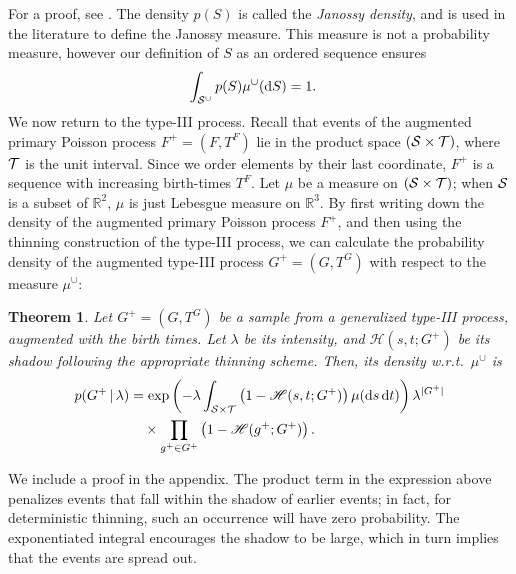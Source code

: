 \documentclass{statsoc}
\newtheorem{thrm}[defn]{Theorem}
\begin{document}
\vspace{-.02in}
For a proof, see \cite{DalVer2008a}. The density $p(S)$ is called the \emph{Janossy density}, and is %
used in the literature to define the Janossy measure. This measure is not a probability measure, however 
our definition of $S$ as an ordered sequence ensures %
\begin{align}
  \int_{\mathcal{S}^{\cup}} p(S) \mu^{\cup}(\mathrm{d} S) &= 1.
\end{align}
We now return to the \matern type-III process. Recall that events of the augmented primary Poisson process ${F^{+} = (F, T^F)}$ lie in the product space
$({\mathcal S} \times {\mathcal T})$, where ${\mathcal T}$ is the unit interval. %
Since we order elements by their last coordinate, $F^+$ is a sequence with increasing birth-times $T^F$.
Let $\mu$ be a measure on $({\mathcal S} \times {\mathcal T})$; when ${\mathcal S}$ is a subset of $\mathbb{R}^2$, $\mu$ is just 
Lebesgue measure on $\mathbb{R}^3$. 
By first writing down the density of the augmented primary Poisson process $F^+$, and then using the thinning construction of the 
\matern type-III process, we can calculate the probability density of the augmented \matern type-III process ${G^{+} = (G, T^G)}$ with respect to the 
measure ${\mu}^{\cup}$:
\begin{thrm}  \label{thrm:mat_dens} Let $G^+ = (G, T^G)$ be a sample from a generalized \matern type-III process, augmented with the birth 
  times. Let $\lambda$ be its intensity, and $\mathscr{H}(s,t;G^+)$ be its shadow following the appropriate thinning scheme. %
Then, its density w.r.t.\  ${\mu}^{\cup}$ is 
\begin{align}
 p(G^+ \,|\, \lambda) &=\exp\left(-\lambda \int_{{\mathcal S} \times {\mathcal T}}\left( 1 - \mathscr{H}(s,t;G^+)\right)\mu(\mathrm{d} s \,\mathrm{d} t)\right)
              \lambda^{|G^+|}  \nonumber \\
         & \quad \times  \prod_{g^+ \in G^+} \left( 1 - \mathscr{H}(g^+;G^+) \right).
\label{eq:mat_marg_prob}
\end{align}
\end{thrm}
We include a proof in the appendix. 
The product term in the expression above penalizes \matern events that fall within the shadow of earlier events; in fact, for deterministic thinning, such
an occurrence will have zero probability. The exponentiated integral encourages the shadow to be large, which in turn implies that the events are 
spread out. 
\end{document}
